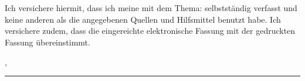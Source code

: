 
\thispagestyle{empty}

\section*{\langerklaerung}

\vspace*{2em}

Ich versichere hiermit, dass ich meine {\arbeit} mit dem Thema: {\itshape \titel } selbstständig verfasst und keine anderen als die angegebenen Quellen und Hilfsmittel benutzt habe. Ich versichere zudem, dass die eingereichte elektronische Fassung mit der gedruckten Fassung übereinstimmt. 


% 



\vspace{3em}

\abgabeort, \datumAbgabe
\vspace{4em}

\rule{6cm}{0.4pt}\\
\autor
